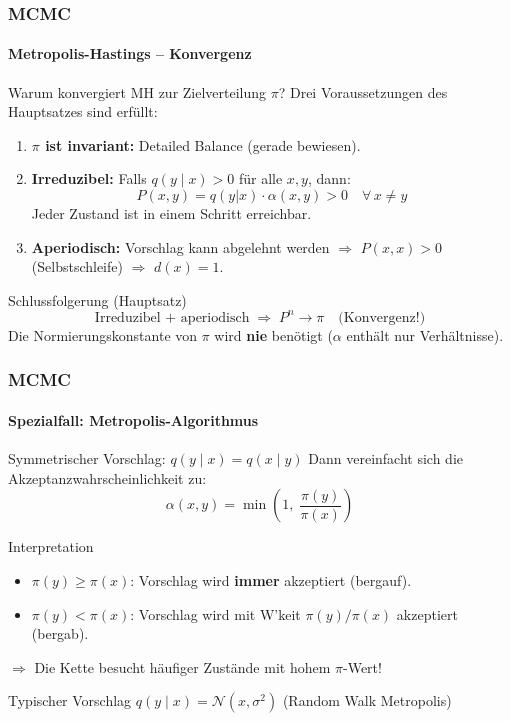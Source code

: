 \documentclass{beamer}
\begin{document}

\begin{frame}
    \frametitle{MCMC}
\framesubtitle{Metropolis-Hastings -- Konvergenz}
    \begin{block}{Warum konvergiert MH zur Zielverteilung $\pi$?}
Drei Voraussetzungen des Hauptsatzes sind erfüllt:
\end{block}
\begin{enumerate}
\item \textbf{$\pi$ ist invariant:} Detailed Balance (gerade bewiesen).
\item \textbf{Irreduzibel:} Falls $q(y \mid x) > 0$ für alle $x,y$, dann:
\[
P(x,y) = q(y|x) \cdot \alpha(x,y) > 0 \quad \forall\, x \neq y
\]
Jeder Zustand ist in einem Schritt erreichbar.
\item \textbf{Aperiodisch:} Vorschlag kann abgelehnt werden $\Rightarrow$ $P(x,x) > 0$ (Selbstschleife) $\Rightarrow$ $d(x) = 1$.
\end{enumerate}
\begin{block}{Schlussfolgerung (Hauptsatz)}
\[
\text{Irreduzibel + aperiodisch} \;\Rightarrow\; P^n \to \pi \quad \text{(Konvergenz!)}
\]
Die Normierungskonstante von $\pi$ wird \textbf{nie} benötigt ($\alpha$ enthält nur Verhältnisse).
\end{block}
 \end{frame}



\begin{frame}
    \frametitle{MCMC}
\framesubtitle{Spezialfall: Metropolis-Algorithmus}
    \begin{block}{Symmetrischer Vorschlag: $q(y \mid x) = q(x \mid y)$}
Dann vereinfacht sich die Akzeptanzwahrscheinlichkeit zu:
\[
\alpha(x, y) = \min\!\left(1, \;\frac{\pi(y)}{\pi(x)}\right)
\]
\end{block}
\begin{block}{Interpretation}
\begin{itemize}
\item $\pi(y) \geq \pi(x)$: Vorschlag wird \textbf{immer} akzeptiert (bergauf).
\item $\pi(y) < \pi(x)$: Vorschlag wird mit W'keit $\pi(y)/\pi(x)$ akzeptiert (bergab).
\end{itemize}
$\Rightarrow$ Die Kette besucht häufiger Zustände mit hohem $\pi$-Wert!
\end{block}
\begin{block}{Typischer Vorschlag}
$q(y \mid x) = \mathcal{N}(x, \sigma^2)$ \quad (Random Walk Metropolis)
\end{block}
 \end{frame}
\end{document}
